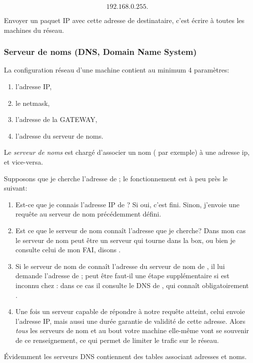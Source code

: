 $$192.168.0.255.$$

Envoyer un paquet IP avec cette adresse de destinataire, c'est écrire
à toutes les machines du réseau.

\subsubsection{Serveur de noms (DNS, Domain Name System)}
La configuration réseau d'une machine contient au minimum 4
paramètres:
\begin{enumerate}
\item l'adresse IP,
\item le netmask,
\item l'adresse de la GATEWAY,
\item l'adresse du serveur de noms.
\end{enumerate}
Le \emph{serveur de noms} est chargé d'associer un nom
( par exemple) à une adresse ip, et vice-versa.

Supposons que je cherche l'adresse de ; le
fonctionnement est à peu près le suivant: 
\begin{enumerate}
  \item Est-ce que je connais l'adresse IP de
    ? Si oui, c'est fini. Sinon, j'envoie une
    requête au serveur de nom précédemment défini.
  \item Est ce que le serveur de nom connaît l'adresse que je cherche?
    Dans mon cas le serveur de nom peut être un serveur qui tourne
    dans la box, ou bien je consulte celui de mon FAI, disons
    .
  \item Si le serveur de nom de  connaît l'adresse du
    serveur de nom de , il lui demande l'adresse de
    ; peut être faut-il une étape
    supplémentaire si   est inconnu chez
    : dans ce cas il consulte le DNS de , qui
    connaît obligatoirement .
  \item Une fois un serveur capable de répondre à notre requête
    atteint, celui envoie l'adresse IP, mais aussi une durée garantie
    de validité de cette adresse. Alors \emph{tous} les serveurs de nom
    et au bout votre machine elle-même vont se souvenir de ce renseignement, ce
    qui  permet de limiter le trafic sur le réseau.
    
\end{enumerate}
Évidemment les serveurs DNS contiennent des tables associant adresses
et noms.
